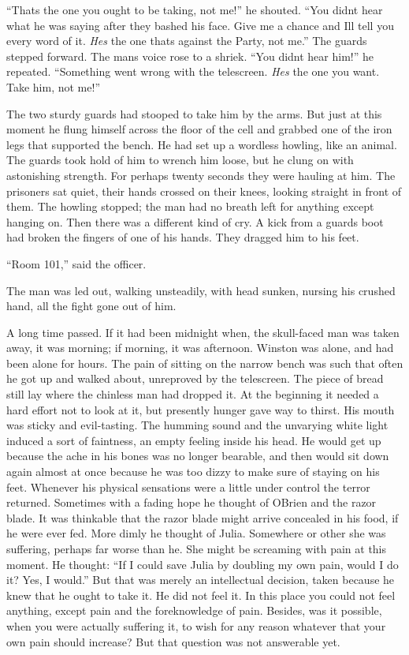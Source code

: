 ``That\textquotesingle s the one you ought to be taking, not me!'' he
shouted. ``You didn\textquotesingle t hear what he was saying after they
bashed his face. Give me a chance and I\textquotesingle ll tell you
every word of it. \emph{He\textquotesingle s} the one
that\textquotesingle s against the Party, not me.'' The guards stepped
forward. The man\textquotesingle s voice rose to a shriek. ``You
didn\textquotesingle t hear him!'' he repeated. ``Something went wrong
with the telescreen. \emph{He\textquotesingle s} the one you want. Take
him, not me!''

The two sturdy guards had stooped to take him by the arms. But just at
this moment he flung himself across the floor of the cell and grabbed
one of the iron legs that supported the bench. He had set up a wordless
howling, like an animal. The guards took hold of him to wrench him
loose, but he clung on with astonishing strength. For perhaps twenty
seconds they were hauling at him. The prisoners sat quiet, their hands
crossed on their knees, looking straight in front of them. The howling
stopped; the man had no breath left for anything except hanging on. Then
there was a different kind of cry. A kick from a guard\textquotesingle s
boot had broken the fingers of one of his hands. They dragged him to his
feet.

``Room 101,'' said the officer.

The man was led out, walking unsteadily, with head sunken, nursing his
crushed hand, all the fight gone out of him.

A long time passed. If it had been midnight when, the skull-faced man
was taken away, it was morning; if morning, it was afternoon. Winston
was alone, and had been alone for hours. The pain of sitting on the
narrow bench was such that often he got up and walked about, unreproved
by the telescreen. The piece of bread still lay where the chinless man
had dropped it. At the beginning it needed a hard effort not to look at
it, but presently hunger gave way to thirst. His mouth was sticky and
evil-tasting. The humming sound and the unvarying white light induced a
sort of faintness, an empty feeling inside his head. He would get up
because the ache in his bones was no longer bearable, and then would sit
down again almost at once because he was too dizzy to make sure of
staying on his feet. Whenever his physical sensations were a little
under control the terror returned. Sometimes with a fading hope he
thought of O\textquotesingle Brien and the razor blade. It was thinkable
that the razor blade might arrive concealed in his food, if he were ever
fed. More dimly he thought of Julia. Somewhere or other she was
suffering, perhaps far worse than he. She might be screaming with pain
at this moment. He thought: ``If I could save Julia by doubling my own
pain, would I do it? Yes, I would.'' But that was merely an intellectual
decision, taken because he knew that he ought to take it. He did not
feel it. In this place you could not feel anything, except pain and the
foreknowledge of pain. Besides, was it possible, when you were actually
suffering it, to wish for any reason whatever that your own pain should
increase? But that question was not answerable yet.

